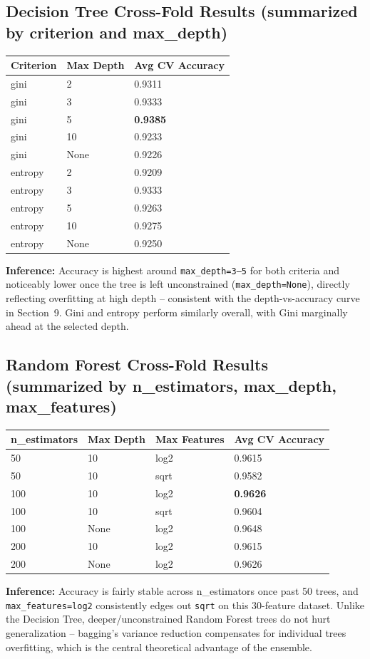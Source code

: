 \documentclass[12pt,a4paper]{article}
\begin{document}
\subsection*{Decision Tree Cross-Fold Results (summarized by criterion and max\_depth)}
\begin{longtable}{|p{3cm}|p{3cm}|p{3.5cm}|}
\hline
\textbf{Criterion} & \textbf{Max Depth} & \textbf{Avg CV Accuracy} \\ \hline
\endhead
gini & 2 & 0.9311 \\ \hline
gini & 3 & 0.9333 \\ \hline
gini & 5 & \textbf{0.9385} \\ \hline
gini & 10 & 0.9233 \\ \hline
gini & None & 0.9226 \\ \hline
entropy & 2 & 0.9209 \\ \hline
entropy & 3 & 0.9333 \\ \hline
entropy & 5 & 0.9263 \\ \hline
entropy & 10 & 0.9275 \\ \hline
entropy & None & 0.9250 \\ \hline
\end{longtable}
\textbf{Inference:} Accuracy is highest around \texttt{max\_depth=3--5} for both criteria and
noticeably lower once the tree is left unconstrained (\texttt{max\_depth=None}), directly
reflecting overfitting at high depth -- consistent with the depth-vs-accuracy curve in
Section~9. Gini and entropy perform similarly overall, with Gini marginally ahead at the
selected depth.

\subsection*{Random Forest Cross-Fold Results (summarized by n\_estimators, max\_depth, max\_features)}
\begin{longtable}{|p{2.3cm}|p{2.3cm}|p{2.7cm}|p{3cm}|}
\hline
\textbf{n\_estimators} & \textbf{Max Depth} & \textbf{Max Features} & \textbf{Avg CV Accuracy} \\ \hline
\endhead
50 & 10 & log2 & 0.9615 \\ \hline
50 & 10 & sqrt & 0.9582 \\ \hline
100 & 10 & log2 & \textbf{0.9626} \\ \hline
100 & 10 & sqrt & 0.9604 \\ \hline
100 & None & log2 & 0.9648 \\ \hline
200 & 10 & log2 & 0.9615 \\ \hline
200 & None & log2 & 0.9626 \\ \hline
\end{longtable}
\textbf{Inference:} Accuracy is fairly stable across n\_estimators once past 50 trees, and
\texttt{max\_features=log2} consistently edges out \texttt{sqrt} on this 30-feature dataset.
Unlike the Decision Tree, deeper/unconstrained Random Forest trees do not hurt generalization
-- bagging's variance reduction compensates for individual trees overfitting, which is the
central theoretical advantage of the ensemble.
\end{document}
